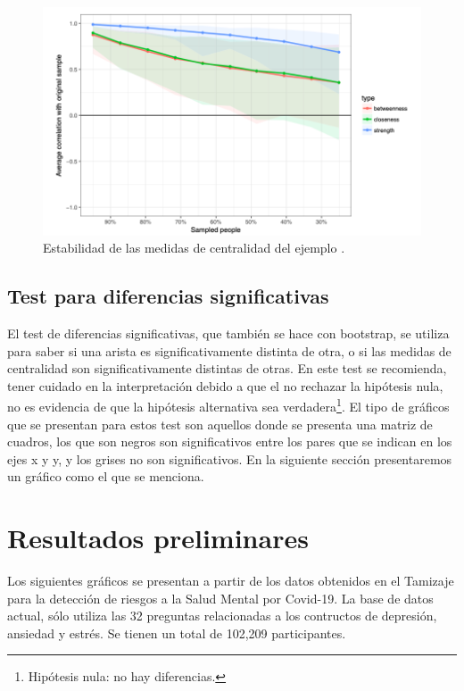 \documentclass[11pt,spanish]{article}\usepackage[]{graphicx}\usepackage[]{color}
\begin{document}
\begin{figure}[!ht]
\centering
\includegraphics[scale=0.5]{images/estabilidad_tutorial}
\caption{Estabilidad de las medidas de centralidad del ejemplo \cite{main_tutorial}.}
\label{fig:estabilidad_tutorial}
\end{figure}

\subsection{Test para diferencias significativas}

El test de diferencias significativas, que también se hace con bootstrap, se utiliza para saber si una arista es significativamente distinta de otra, o si las medidas de centralidad son significativamente distintas de otras. En este test se recomienda, tener cuidado en la interpretación debido a que el no rechazar la hipótesis nula, no es evidencia de que la hipótesis alternativa sea verdadera\footnote{Hipótesis nula: no hay diferencias.}. El tipo de gráficos que se presentan para estos test son aquellos donde se presenta una matriz de cuadros, los que son negros son significativos entre los pares que se indican en los ejes x y y, y los grises no son significativos. En la siguiente sección presentaremos un gráfico como el que se menciona. 

\newpage

\section{Resultados preliminares}



Los siguientes gráficos se presentan a partir de los datos obtenidos en el Tamizaje para la detección de riesgos a la Salud Mental por Covid-19. La base de datos actual, sólo utiliza las 32 preguntas relacionadas a los contructos de depresión, ansiedad y estrés. Se tienen un total de 102,209 participantes.
\end{document}
